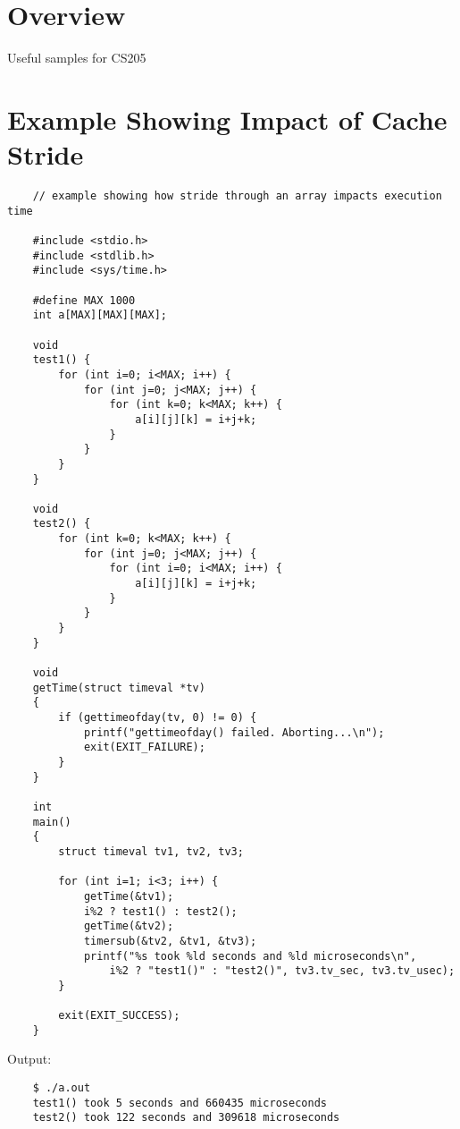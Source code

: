 \documentclass[12pt,letterpaper]{article}
\begin{document}
	\section*{Overview}

	Useful samples for CS205

	\setcounter{tocdepth}{1}
	\tableofcontents
	\clearpage

	\section{Example Showing Impact of Cache Stride}\label{stride}

	\begin{verbatim}
	// example showing how stride through an array impacts execution time
	
	#include <stdio.h>
	#include <stdlib.h>
	#include <sys/time.h>
	
	#define MAX 1000
	int a[MAX][MAX][MAX];
	
	void
	test1() {
	    for (int i=0; i<MAX; i++) {
	        for (int j=0; j<MAX; j++) {
	            for (int k=0; k<MAX; k++) {
	                a[i][j][k] = i+j+k;
	            }
	        }
	    }
	}
    
	void
	test2() {
	    for (int k=0; k<MAX; k++) {
	        for (int j=0; j<MAX; j++) {
	            for (int i=0; i<MAX; i++) {
	                a[i][j][k] = i+j+k;
	            }
	        }
	    }
	}
    
	void
	getTime(struct timeval *tv)
	{
	    if (gettimeofday(tv, 0) != 0) {
	        printf("gettimeofday() failed. Aborting...\n");
	        exit(EXIT_FAILURE);
	    }
	}
    
	int
	main() 
	{
	    struct timeval tv1, tv2, tv3;
        
	    for (int i=1; i<3; i++) {
	        getTime(&tv1);
	        i%2 ? test1() : test2();
	        getTime(&tv2);
	        timersub(&tv2, &tv1, &tv3);
	        printf("%s took %ld seconds and %ld microseconds\n",
	            i%2 ? "test1()" : "test2()", tv3.tv_sec, tv3.tv_usec);
	    }
        
	    exit(EXIT_SUCCESS);
	}
	\end{verbatim}


	\noindent Output:
	\begin{verbatim}
	$ ./a.out
	test1() took 5 seconds and 660435 microseconds
	test2() took 122 seconds and 309618 microseconds
	\end{verbatim}
\end{document}
